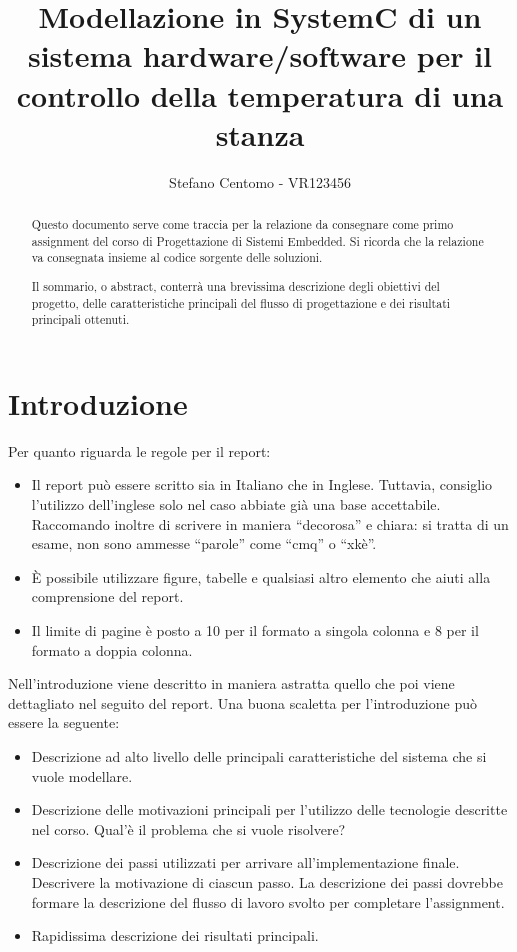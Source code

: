 \documentclass[]{IEEEtran}
\title{Modellazione in SystemC di un sistema hardware/software per il controllo della temperatura di una stanza}
\author{Stefano Centomo - VR123456}
\begin{document}
\maketitle

\begin{abstract}
Questo documento serve come traccia per la relazione da consegnare come primo assignment del corso di Progettazione di Sistemi Embedded. Si ricorda che la relazione va consegnata insieme al codice sorgente delle soluzioni.

Il sommario, o abstract, conterr\`a una brevissima descrizione degli obiettivi del progetto, delle caratteristiche principali del flusso di progettazione e dei risultati principali ottenuti. 
\end{abstract}

\section{Introduzione}

Per quanto riguarda le regole per il report:
\begin{itemize}
\item Il report pu\`o essere scritto sia in Italiano che in Inglese. Tuttavia, consiglio l'utilizzo dell'inglese solo nel caso abbiate gi\`a una base accettabile. Raccomando inoltre di scrivere in maniera ``decorosa'' e chiara: si tratta di un esame, non sono ammesse ``parole'' come ``cmq'' o ``xk\`e''.
\item \`E possibile utilizzare figure, tabelle e qualsiasi altro elemento che aiuti alla comprensione del report.

\item Il limite di pagine \`e posto a 10 per il formato a singola colonna e 8 per il formato a doppia colonna.
\end{itemize}

Nell'introduzione viene descritto in maniera astratta quello che poi viene dettagliato nel seguito del report. Una buona scaletta per l'introduzione pu\`o essere la seguente:
\begin{itemize}
\item Descrizione ad alto livello delle principali caratteristiche del sistema che si vuole modellare.
\item Descrizione delle motivazioni principali per l'utilizzo delle tecnologie descritte nel corso. Qual'\`e il problema che si vuole risolvere?
\item Descrizione dei passi utilizzati per arrivare all'implementazione finale. Descrivere la motivazione di ciascun passo. La descrizione dei passi dovrebbe formare la descrizione del flusso di lavoro svolto per completare l'assignment.
\item Rapidissima descrizione dei risultati principali.
\end{itemize}
\end{document}
